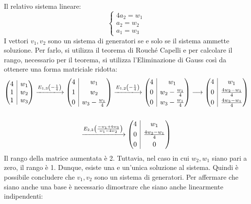 \documentclass[a4paper]{article}
\makeatletter
\newenvironment{rowequmat}[1]{\left(\array{@{}#1@{}}}{\endarray\right)}
\makeatother
\begin{document}
	Il relativo sistema lineare:
	\begin{equation*}
		\begin{cases}
			4a_{2} = w_{1} \\
			a_{2} = w_{2} \\
			a_{1} = w_{3}
		\end{cases}
	\end{equation*}
	I vettori $v_{1},v_{2}$ sono un sistema di generatori se e solo se il sistema ammette soluzione. Per farlo, si utilizza il teorema di Rouché Capelli e per calcolare il rango, necessario per il teorema, si utilizza l'Eliminazione di Gauss così da ottenere una forma matriciale ridotta:
	\begin{gather*}
		\begin{rowequmat}{c|c}
			4 & w_{1} \\
			1 & w_{2} \\
			1 & w_{3}
		\end{rowequmat}
		\xlongrightarrow{E_{1,3}\left(-\frac{1}{4}\right)}
		\begin{rowequmat}{c|c}
			4 & w_{1} \\ [0.3em]
			1 & w_{2} \\ [0.3em]
			0 & w_{3} - \frac{w_{1}}{4}
		\end{rowequmat}
		\xlongrightarrow{E_{1,2}\left(-\frac{1}{4}\right)}
		\begin{rowequmat}{c|c}
			4 & w_{1} \\ [0.3em]
			0 & w_{2} - \frac{w_{1}}{4} \\ [0.3em]
			0 & w_{3} - \frac{w_{1}}{4}
		\end{rowequmat}
		\longrightarrow
		\begin{rowequmat}{c|c}
			4 & w_{1} \\ [0.3em]
			0 & \frac{4w_{2} - w_{1}}{4} \\ [0.3em]
			0 & \frac{4w_{3} - w_{1}}{4}
		\end{rowequmat} \\
		\\
		\xlongrightarrow{E_{2,3} \left( \frac{-w_{1} + 4w_{3}}{w_{1} - 4w_{2}} \right) }
		\begin{rowequmat}{c|c}
			4 & w_{1} \\ [0.3em]
			0 & \frac{4w_{2} - w_{1}}{4} \\ [0.3em]
			0 & 0
		\end{rowequmat}
	\end{gather*}
	Il rango della matrice aumentata è 2. Tuttavia, nel caso in cui $w_{2}, w_{1}$ siano pari a zero, il rango è 1. Dunque, esiste una e un'unica soluzione al sistema. Quindi è possibile concludere che $v_{1},v_{2}$ sono un sistema di generatori. Per affermare che siano anche una base è necessario dimostrare che siano anche linearmente indipendenti:
\end{document}

